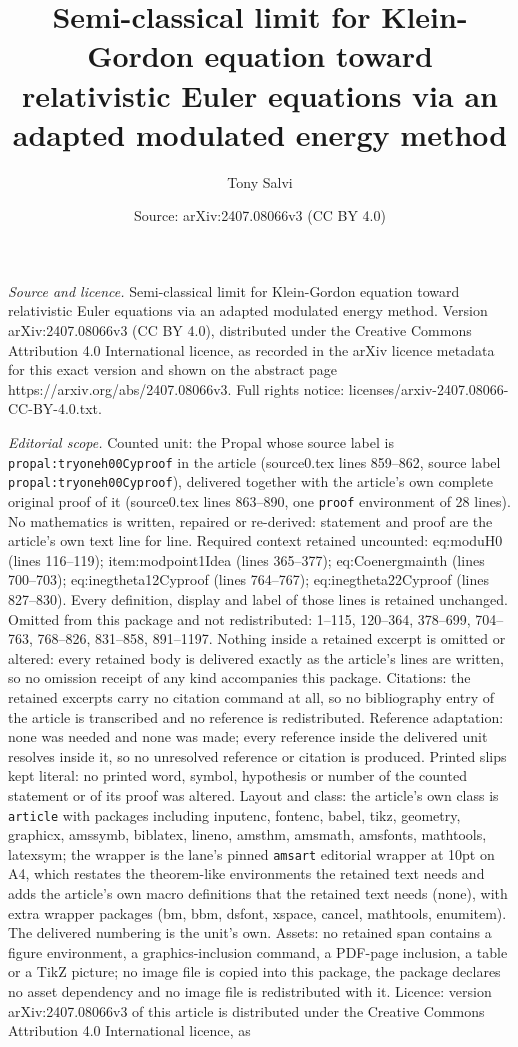 \documentclass[10pt,a4paper]{amsart}
\title[Semi-classical limit for Klein-Gordon equation toward relati]{Semi-classical limit for Klein-Gordon equation toward relativistic Euler equations via an adapted modulated energy method}
\author{Tony Salvi}
\date{Source: arXiv:2407.08066v3 (CC BY 4.0)}
\begin{document}
\maketitle

\noindent\emph{Source and licence.} Semi-classical limit for Klein-Gordon equation toward relativistic Euler equations via an adapted modulated energy method. Version arXiv:2407.08066v3 (CC BY 4.0), distributed under the Creative Commons Attribution 4.0 International licence, as recorded in the arXiv licence metadata for this exact version and shown on the abstract page https://arxiv.org/abs/2407.08066v3. Full rights notice: licenses/arxiv-2407.08066-CC-BY-4.0.txt.\par\smallskip

\noindent\textit{Editorial scope.} Counted unit: the Propal whose source label is \texttt{propal:tryoneh00Cyproof} in the article (source0.tex lines 859--862, source label \texttt{propal:tryoneh00Cyproof}), delivered together with the article's own complete original proof of it (source0.tex lines 863--890, one \texttt{proof} environment of 28 lines). No mathematics is written, repaired or re-derived: statement and proof are the article's own text line for line. Required context retained uncounted: eq:moduH0 (lines 116--119); item:modpoint1Idea (lines 365--377); eq:Coenergmainth (lines 700--703); eq:inegtheta12Cyproof (lines 764--767); eq:inegtheta22Cyproof (lines 827--830). Every definition, display and label of those lines is retained unchanged. Omitted from this package and not redistributed: 1--115, 120--364, 378--699, 704--763, 768--826, 831--858, 891--1197. Nothing inside a retained excerpt is omitted or altered: every retained body is delivered exactly as the article's lines are written, so no omission receipt of any kind accompanies this package. Citations: the retained excerpts carry no citation command at all, so no bibliography entry of the article is transcribed and no reference is redistributed. Reference adaptation: none was needed and none was made; every reference inside the delivered unit resolves inside it, so no unresolved reference or citation is produced. Printed slips kept literal: no printed word, symbol, hypothesis or number of the counted statement or of its proof was altered. Layout and class: the article's own class is \texttt{article} with packages including inputenc, fontenc, babel, tikz, geometry, graphicx, amssymb, biblatex, lineno, amsthm, amsmath, amsfonts, mathtools, latexsym; the wrapper is the lane's pinned \texttt{amsart} editorial wrapper at 10pt on A4, which restates the theorem-like environments the retained text needs and adds the article's own macro definitions that the retained text needs (none), with extra wrapper packages (bm, bbm, dsfont, xspace, cancel, mathtools, enumitem). The delivered numbering is the unit's own. Assets: no retained span contains a figure environment, a graphics-inclusion command, a PDF-page inclusion, a table or a TikZ picture; no image file is copied into this package, the package declares no asset dependency and no image file is redistributed with it. Licence: version arXiv:2407.08066v3 of this article is distributed under the Creative Commons Attribution 4.0 International licence, as 
\end{document}
